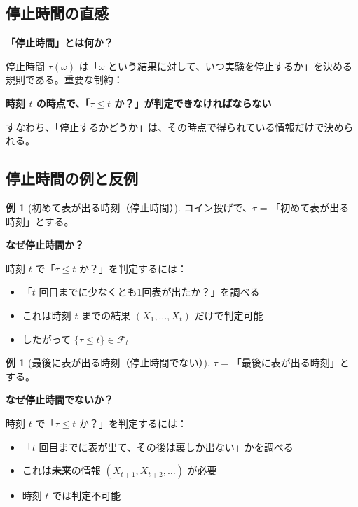 \documentclass[12pt,a4paper,ja=standard]{bxjsarticle}
\theoremstyle{definition}
\newtheorem{example}[definition]{例}
\begin{document}
\subsection{停止時間の直感}

\begin{insight}
\textbf{「停止時間」とは何か？}

停止時間 $\tau(\omega)$ は「$\omega$ という結果に対して、いつ実験を停止するか」を決める規則である。重要な制約：

\begin{center}
\textbf{時刻 $t$ の時点で、「$\tau \leq t$ か？」が判定できなければならない}
\end{center}

すなわち、「停止するかどうか」は、その時点で得られている情報だけで決められる。
\end{insight}

\subsection{停止時間の例と反例}

\begin{example}[初めて表が出る時刻（停止時間）]
コイン投げで、$\tau$ = 「初めて表が出る時刻」とする。

\textbf{なぜ停止時間か？}

時刻 $t$ で「$\tau \leq t$ か？」を判定するには：
\begin{itemize}
    \item 「$t$ 回目までに少なくとも1回表が出たか？」を調べる
    \item これは時刻 $t$ までの結果 $(X_1, \ldots, X_t)$ だけで判定可能
    \item したがって $\{\tau \leq t\} \in \mathcal{F}_t$
\end{itemize}
\end{example}

\begin{example}[最後に表が出る時刻（停止時間でない）]
$\tau$ = 「最後に表が出る時刻」とする。

\textbf{なぜ停止時間でないか？}

時刻 $t$ で「$\tau \leq t$ か？」を判定するには：
\begin{itemize}
    \item 「$t$ 回目までに表が出て、その後は裏しか出ない」かを調べる
    \item これは\textbf{未来}の情報 $(X_{t+1}, X_{t+2}, \ldots)$ が必要
    \item 時刻 $t$ では判定不可能
\end{itemize}
\end{example}
\end{document}
